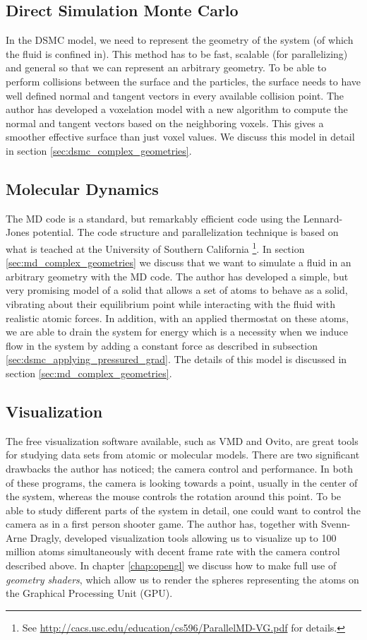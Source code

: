\subsection{Direct Simulation Monte Carlo}
In the DSMC model, we need to represent the geometry of the system (of which the fluid is confined in). This method has to be fast, scalable (for parallelizing) and general so that we can represent an arbitrary geometry. To be able to perform collisions between the surface and the particles, the surface needs to have well defined normal and tangent vectors in every available collision point. The author has developed a voxelation model with a new algorithm to compute the normal and tangent vectors based on the neighboring voxels. This gives a smoother effective surface than just voxel values. We discuss this model in detail in section \ref{sec:dsmc_complex_geometries}.
\subsection{Molecular Dynamics}
The MD code is a standard, but remarkably efficient code using the Lennard-Jones potential. The code structure and parallelization technique is based on what is teached at the University of Southern California \footnote{See \url{http://cacs.usc.edu/education/cs596/ParallelMD-VG.pdf} for details.}. In section \ref{sec:md_complex_geometries} we discuss that we want to simulate a fluid in an arbitrary geometry with the MD code. The author has developed a simple, but very promising model of a solid that allows a set of atoms to behave as a solid, vibrating about their equilibrium point while interacting with the fluid with realistic atomic forces. In addition, with an applied thermostat on these atoms, we are able to drain the system for energy which is a necessity when we induce flow in the system by adding a constant force as described in subsection \ref{sec:dsmc_applying_pressured_grad}. The details of this model is discussed in section \ref{sec:md_complex_geometries}.
\subsection{Visualization}
The free visualization software available, such as VMD and Ovito, are great tools for studying data sets from atomic or molecular models. There are two significant drawbacks the author has noticed; the camera control and performance. In both of these programs, the camera is looking towards a point, usually in the center of the system, whereas the mouse controls the rotation around this point. To be able to study different parts of the system in detail, one could want to control the camera as in a first person shooter game. The author has, together with Svenn-Arne Dragly, developed visualization tools allowing us to visualize up to 100 million atoms simultaneously with decent frame rate with the camera control described above. In chapter \ref{chap:opengl} we discuss how to make full use of \textit{geometry shaders}, which allow us to render the spheres representing the atoms on the Graphical Processing Unit (GPU). 

